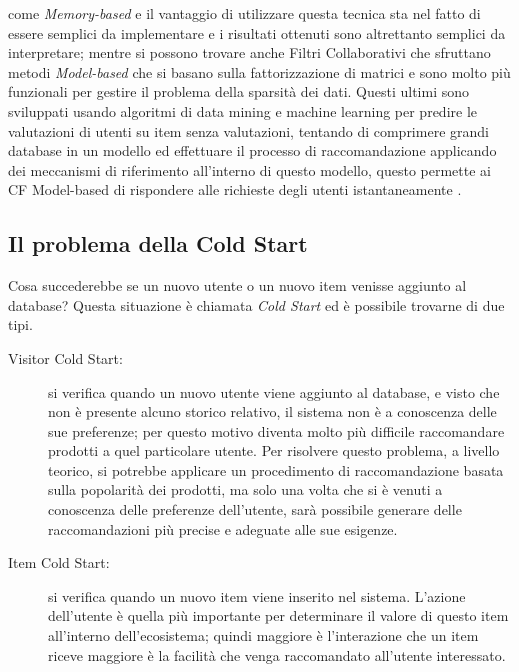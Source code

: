 come \textit{Memory-based} e il vantaggio di utilizzare questa tecnica sta nel fatto di essere semplici da implementare e i risultati 
ottenuti sono altrettanto semplici da interpretare; mentre si possono trovare anche Filtri Collaborativi che sfruttano metodi 
\textit{Model-based} che si basano sulla fattorizzazione di matrici e sono molto più funzionali per gestire il problema della 
sparsità dei dati. Questi ultimi sono sviluppati usando algoritmi di data mining e machine learning per predire le valutazioni di utenti 
su item senza valutazioni, tentando di comprimere grandi database in un modello ed effettuare il processo di raccomandazione applicando dei 
meccanismi di riferimento all'interno di questo modello, questo permette ai CF Model-based di rispondere alle richieste degli utenti 
istantaneamente \cite{model-based-approach-for-collaborative-filtering}.
%
\subsection{Il problema della Cold Start}
Cosa succederebbe se un nuovo utente o un nuovo item venisse aggiunto al database? Questa situazione è chiamata \textit{Cold Start} ed 
è possibile trovarne di due tipi.
\begin{description}
    \item[Visitor Cold Start:] si verifica quando un nuovo utente viene aggiunto al database, e visto che non è presente alcuno storico relativo, 
    il sistema non è a conoscenza delle sue preferenze; per questo motivo diventa molto più difficile raccomandare prodotti a quel particolare utente. 
    Per risolvere questo problema, a livello teorico, si potrebbe applicare un procedimento di raccomandazione basata sulla popolarità dei prodotti, ma 
    solo una volta che si è venuti a conoscenza delle preferenze dell'utente, sarà possibile generare delle raccomandazioni più precise e adeguate 
    alle sue esigenze.
    \item[Item Cold Start:] si verifica quando un nuovo item viene inserito nel sistema. L'azione dell'utente è quella più importante per determinare 
    il valore di questo item all'interno dell'ecosistema; quindi maggiore è l'interazione che un item riceve maggiore è la facilità che venga raccomandato 
    all'utente interessato.
\end{description}
